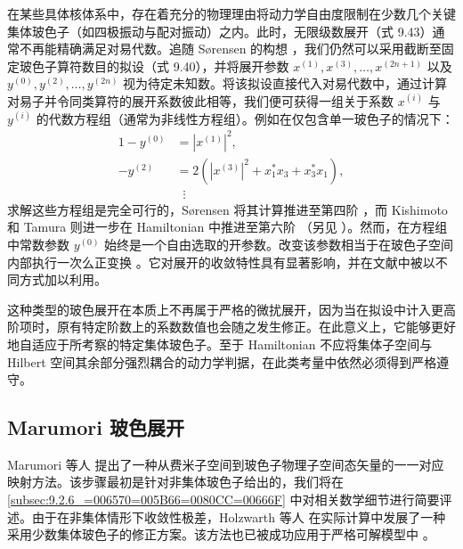 在某些具体核体系中，存在着充分的物理理由将动力学自由度限制在少数几个关键集体玻色子（如四极振动与配对振动）之内。此时，无限级数展开（式
9.43）通常不再能精确满足对易代数。追随 Sørensen 的构想 \cite{So67}，我们仍然可以采用截断至固定玻色子算符数目的拟设（式
9.40），并将展开参数 $x^{(1)},x^{(3)},\ldots,x^{(2n+1)}$ 以及 $y^{(0)},y^{(2)},\ldots,y^{(2n)}$
视为待定未知数。将该拟设直接代入对易代数中，通过计算对易子并令同类算符的展开系数彼此相等，我们便可获得一组关于系数 $x^{(i)}$
与 $y^{(i)}$ 的代数方程组（通常为非线性方程组）。例如在仅包含单一玻色子的情况下：
\begin{align}
1-y^{(0)} & =|x^{(1)}|^{2},\nonumber \\
-y^{(2)} & =2\left(|x^{(3)}|^{2}+x^{*}_{1}x_{3}+x^{*}_{3}x_{1}\right),\label{eq:9.52}\\
 & \;\;\vdots\nonumber 
\end{align}
求解这些方程组是完全可行的，Sørensen 将其计算推进至第四阶 \cite{So67,So68a,So68b,So69,So70,So71,So73}，而
Kishimoto 和 Tamura 则进一步在 Hamiltonian 中推进至第六阶 \cite{KT72,KT76}（另见
\cite{SP77b}）。然而，在方程组中常数参数 $y^{(0)}$ 始终是一个自由选取的开参数。改变该参数相当于在玻色子空间内部执行一次么正变换
\cite{So68b}。它对展开的收敛特性具有显著影响，并在文献中被以不同方式加以利用。

这种类型的玻色展开在本质上不再属于严格的微扰展开，因为当在拟设中计入更高阶项时，原有特定阶数上的系数数值也会随之发生修正。在此意义上，它能够更好地自适应于所考察的特定集体玻色子。至于
Hamiltonian 不应将集体子空间与 Hilbert 空间其余部分强烈耦合的动力学判据，在此类考量中依然必须得到严格遵守。

\subsection{Marumori 玻色展开\label{subsec:9.2.4_Marumori=0073BB=008272=005C55=005F00}}

Marumori 等人 \cite{MYT64a,MYT64b} 提出了一种从费米子空间到玻色子物理子空间态矢量的一一对应映射方法。该步骤最初是针对非集体玻色子给出的，我们将在
\ref{subsec:9.2.6_=006570=005B66=0080CC=00666F} 中对相关数学细节进行简要评述。由于在非集体情形下收敛性极差，Holzwarth
等人 \cite{LH75} 在实际计算中发展了一种采用少数集体玻色子的修正方案。该方法也已被成功应用于严格可解模型中 \cite{PKD68,KI69}。

